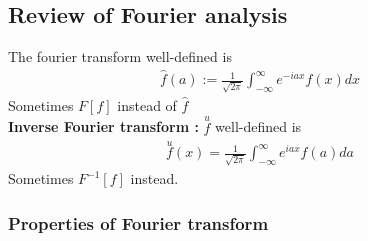 \subsection{Review of Fourier analysis}
The fourier transform well-defined is 
\begin{align*}
    \hat{f}(a) := \frac{1}{\sqrt{2\pi}} \int_{-\infty}^\infty e^{-i a x}f(x)dx
\end{align*}
Sometimes $F[f]$ instead of $\hat{f}$ \\
\textbf{Inverse Fourier transform : } $\overset{u}{f}$ well-defined is 
\begin{align*}
    \overset{u}{f}(x) =  \frac{1}{\sqrt{2\pi}} \int_{-\infty}^\infty  e^{iax}f(a)da
\end{align*}
Sometimes $F^{-1}[f]$ instead. 
\subsubsection{Properties of Fourier transform}

